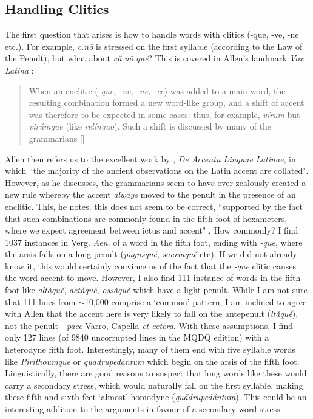 \documentclass[11pt,a4paper]{scrartcl} %
\newcommand{\ictmacron}[1]{\twoacc[\'|\={#1}]}
\begin{document}
{\subsection{Handling Clitics}

The first question that arises is how to handle words with clitics (-que, -ve, -ne etc.). For example, \textit{c\twoacc[\'|\u{a}].n\=o} is stressed on the first syllable (according to the Law of the Penult), but what about \textit{c\v a.n\=o.qu\v e}? This is covered in Allen's landmark \textit {Vox Latina} \cite[87]{sidney1965vox}:
\begin{quote}
When an enclitic (\textit{-que, -ue, -ne, -ce}) was added to a main word, the resulting combination formed a new word-like group, and a shift of accent was therefore to be expected in some cases: thus, for example, \textit{v\'irum} but \textit{vir\'umque} (like \textit{rel\'inquo}). Such a shift is discussed by many of the grammarians [\textellipsis]
\end{quote}
Allen then refers us to the excellent work by \cite{schoell}, \textit{De Accentu Linguae Latinae}, in which ``the majority of the ancient observations on the Latin accent are collated". However, as he discusses, the grammarians seem to have over-zealously created a new rule whereby the accent \textit{always} moved to the penult in the presence of an enclitic. This, he notes, this does not seem to be correct, ``supported by the fact that such combinations are commonly found in the fifth foot of hexameters, where we expect agreement between ictus and accent" \cite[87]{sidney1965vox}. How commonly? I find 1037 instances in Verg. \textit{Aen}. of a word in the fifth foot, ending with \textit{-que}, where the arsis falls on a long penult (\textit{p\=ugn\ictmacron{a}squ\v e}, \textit{s\=acr\ictmacron{u}mqu\v e} etc). If we did not already know it, this would certainly convince us of the fact that the \textit{-que} clitic causes the word accent to move. However, I also find 111 instance of words in the fifth foot like \textit{\= alt\v aqu\v e}, \textit{\=act\v aqu\v e}, \textit{\=oss\v aqu\v e} which have a light penult. While I am not sure that 111 lines from $\sim$10,000 comprise a `common' pattern, I am inclined to agree with Allen that the accent here is very likely to fall on the antepenult (\textit{\ictmacron{a}lt\v aqu\v e}), not the penult---\textit{pace} Varro, Capella \textit{et cetera}. With these assumptions, I find only 127 lines (of 9840 uncorrupted lines in the MQDQ edition) with a heterodyne fifth foot. Interestingly, many of them end with five syllable words like \textit{Pirithoumque} or \textit{quadrupedantum} which begin on the arsis of the fifth foot. Linguistically, there are good reasons to suspect that long words like these would carry a secondary stress, which would naturally fall on the first syllable, making these fifth and sixth feet `almost' homodyne (\textit{qu\H adruped\'antum}). This could be an interesting addition to the arguments in favour of a secondary word stress.

}
\end{document}
